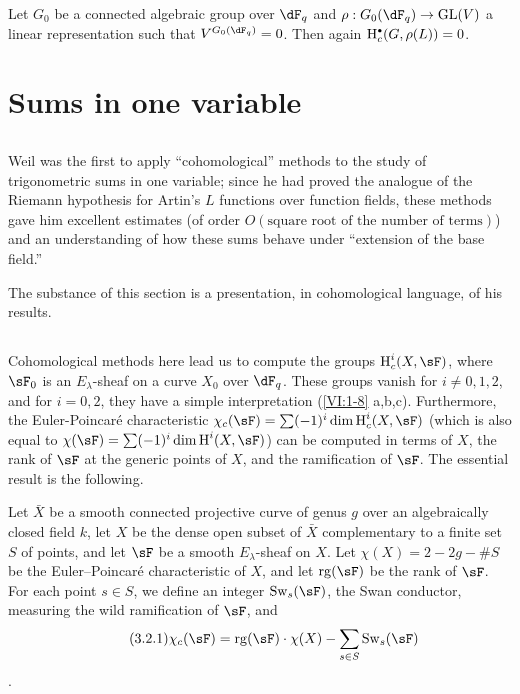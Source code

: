 Let $G_0$ be a connected algebraic group over $\dF_q$ and 
$\rho:G_0(\dF_q) \to \operatorname{GL}(V)$ a linear representation 
such that $V^{G_0(\dF_q)}=0$. Then again $\h_c^\bullet(G,\rho(L))=0$. 










\section{Sums in one variable}\label{VI:3}





\subsection{}\label{VI:3-1}

Weil was the first to apply ``cohomological'' methods to 
the study of trigonometric sums in one variable; since he had 
proved the analogue of the Riemann hypothesis for Artin's $L$ functions 
over function fields, these methods gave him excellent 
estimates (of order $O(\text{square root of the number of terms})$) and an 
understanding of how these sums behave under ``extension of the base field.'' 

The substance of this section is a presentation, in cohomological language, of 
his results. 





\subsection{}\label{VI:3-2}

Cohomological methods here lead us to compute the groups 
$\h_c^i(X,\sF)$, where $\sF_0$ is an $E_\lambda$-sheaf on a curve $X_0$ over 
$\dF_q$. These groups vanish for $i\ne 0,1,2$, and for 
$i=0,2$, they have a simple interpretation (\ref{VI:1-8} a,b,c). Furthermore, the 
Euler-Poincaré characteristic 
$\chi_c(\sF) = \sum (-1)^i \dim \h_c^i(X,\sF)$ (which is also equal to 
$\chi(\sF) = \sum (-1)^i \dim \h^i(X,\sF)$) can be computed in terms of 
$X$, the rank of $\sF$ at the generic points of $X$, and the 
ramification of $\sF$. The essential result is the following. 

Let $\bar X$ be a smooth connected projective curve of genus $g$ over an 
algebraically closed field $k$, let $X$ be the dense open subset of $\bar X$ 
complementary to a finite set $S$ of points, and let $\sF$ be a 
smooth $E_\lambda$-sheaf on $X$. Let $\chi(X)=2-2 g-\# S$ be the 
Euler--Poincaré characteristic of $X$, and let $\operatorname{rg}(\sF)$ be the 
rank of $\sF$. For each point $s\in S$, we define an integer 
$\swan_s(\sF)$, the Swan conductor, measuring the wild ramification of 
$\sF$, and 
\begin{align*}\tag{3.2.1}\label{VI:eq:3-2-1}
  \chi_c(\sF) = \operatorname{rg}(\sF) \cdot \chi(X) - \sum_{s\in S} \swan_s(\sF) 
\end{align*}
\cite{ra65}. 





